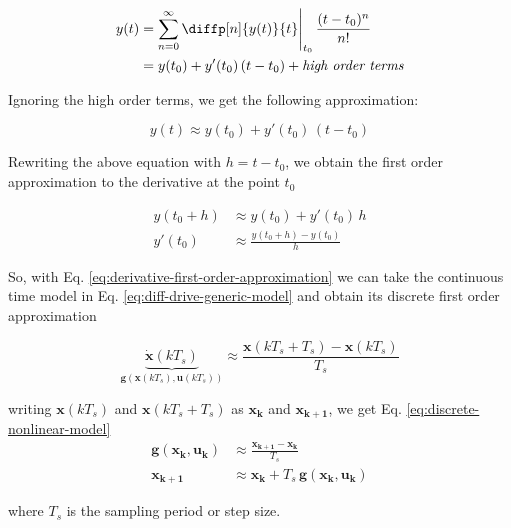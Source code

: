\documentclass[12pt]{article}
\begin{document}
\begin{equation}
\begin{aligned}
    y(t) &= \sum_{n=0}^\infty \diffp[n]{y(t)}{t}\Bigg\lvert_{t_0} \, \frac{(t - t_0)^n}{n!} \\
    &= y(t_0) + y'(t_0)\,(t - t_0) + \text{\textit{high order terms}}
\end{aligned}
\end{equation}

Ignoring the high order terms, we get the following approximation:

\begin{equation}
    y(t) \approx y(t_0) + y'(t_0)\,(t-t_0)
\end{equation}

Rewriting the above equation with $h = t - t_0$, we obtain the first order approximation to the derivative at the point $t_0$

\begin{equation}
\begin{aligned}
    y(t_0 + h) &\approx y(t_0) + y'(t_0)\,h\\
    y'(t_0) &\approx \frac{y(t_0 + h) - y(t_0)}{h}
\end{aligned}
\label{eq:derivative-first-order-approximation}
\end{equation}

So, with Eq. \ref{eq:derivative-first-order-approximation} we can take the continuous time model in Eq. \ref{eq:diff-drive-generic-model} and obtain its discrete first order approximation

\begin{equation*}
    \underbrace{\mathbf{\dot{x}}(kT_s)}_{\boldsymbol{g}(\mathbf{x}(kT_s), \mathbf{u}(kT_s))} \approx \frac{\mathbf{x}(kT_s + T_s) - \mathbf{x}(kT_s)}{T_s}
\end{equation*}

writing $\mathbf{x}(kT_s)$ and $\mathbf{x}(kT_s + T_s)$ as $\mathbf{x_k}$ and $\mathbf{x_{k+1}}$, we get Eq. \ref{eq:discrete-nonlinear-model}
\begin{equation}
    \begin{aligned}
    \boldsymbol{g}(\mathbf{x_k, u_k}) &\approx \frac{\mathbf{x_{k+1} - x_k}}{T_s} \\
    \mathbf{x_{k+1}} &\approx \mathbf{x_k} + T_s \, \boldsymbol{g}(\mathbf{x_k, u_k})
    \end{aligned}
\label{eq:discrete-nonlinear-model}
\end{equation}

where $T_s$ is the sampling period or step size.
\end{document}
